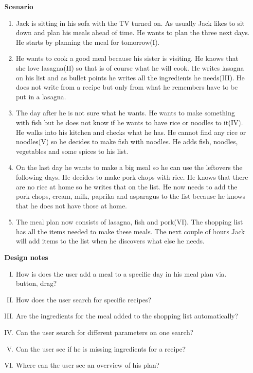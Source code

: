 \textbf{Scenario}
\begin{enumerate}
\item Jack is sitting in his sofa with the TV turned on. As usually Jack likes to sit down and plan his meals ahead of time. He wants to plan the three next days. He starts by planning the meal for tomorrow(I).   
\item He wants to cook a good meal because his sister is visiting. He knows that she love lasagna(II) so that is of course what he will cook. He writes lasagna on his list and as bullet points he writes all the ingredients he needs(III). He does not write from a recipe but only from what he remembers have to be put in a lasagna.
\item The day after he is not sure what he wants. He wants to make something with fish but he does not know if he wants to have rice or noodles to it(IV). He walks into his kitchen and checks what he has. He cannot find any rice or noodles(V) so he decides to make fish with noodles. He adds fish, noodles, vegetables and some spices to his list.
\item On the last day he wants to make a big meal so he can use the leftovers the following days. He decides to make pork chops with rice. He knows that there are no rice at home so he writes that on the list. He now needs to add the pork chops, cream, milk, paprika and asparagus to the list because he knows that he does not have those at home. 
\item The meal plan now consists of lasagna, fish and pork(VI). The shopping list has all the items needed to make these meals. The next couple of hours Jack will add items to the list when he discovers what else he needs.   
\end{enumerate}

\textbf{Design notes}
\begin{enumerate} [(I)]
\item How is does the user add a meal to a specific day in his meal plan via. button, drag?
\item How does the user search for specific recipes?
\item Are the ingredients for the meal added to the shopping list automatically?
\item Can the user search for different parameters on one search?
\item Can the user see if he is missing ingredients for a recipe?
\item Where can the user see an overview of his plan?
\end{enumerate}

%